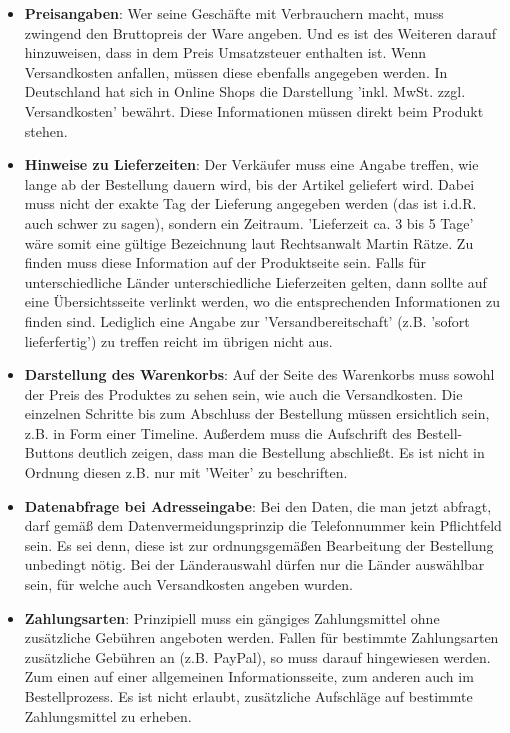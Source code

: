 \documentclass[a4paper]{article}
\begin{document}
\begin{itemize}

\item \textbf{Preisangaben}: Wer seine Geschäfte mit Verbrauchern macht, muss zwingend den Bruttopreis der Ware angeben. Und es ist des Weiteren darauf hinzuweisen, dass in dem Preis Umsatzsteuer enthalten ist. Wenn Versandkosten anfallen, müssen diese ebenfalls angegeben werden. In Deutschland hat sich in Online Shops die Darstellung 'inkl. MwSt. zzgl. Versandkosten' bewährt. Diese Informationen müssen direkt beim Produkt stehen.

\item \textbf{Hinweise zu Lieferzeiten}: Der Verkäufer muss eine Angabe treffen, wie lange ab der Bestellung dauern wird, bis der Artikel geliefert wird. Dabei muss nicht der exakte Tag der Lieferung angegeben werden (das ist i.d.R. auch schwer zu sagen), sondern ein Zeitraum. 'Lieferzeit ca. 3 bis 5 Tage' wäre somit eine gültige Bezeichnung laut Rechtsanwalt Martin Rätze. Zu finden muss diese Information auf der Produktseite sein. Falls für unterschiedliche Länder unterschiedliche Lieferzeiten gelten, dann sollte auf eine Übersichtsseite verlinkt werden, wo die entsprechenden Informationen zu finden sind. Lediglich eine Angabe zur 'Versandbereitschaft' (z.B. 'sofort lieferfertig') zu treffen reicht im übrigen nicht aus.

\item \textbf{Darstellung des Warenkorbs}: Auf der Seite des Warenkorbs muss sowohl der Preis des Produktes zu sehen sein, wie auch die Versandkosten. Die einzelnen Schritte bis zum Abschluss der Bestellung müssen ersichtlich sein, z.B. in Form einer Timeline. Außerdem muss die Aufschrift des Bestell-Buttons deutlich zeigen, dass man die Bestellung abschließt. Es ist nicht in Ordnung diesen z.B. nur mit 'Weiter' zu beschriften.

\item \textbf{Datenabfrage bei Adresseingabe}: Bei den Daten, die man jetzt abfragt, darf gemäß dem Datenvermeidungsprinzip die Telefonnummer kein Pflichtfeld sein. Es sei denn, diese ist zur ordnungsgemäßen Bearbeitung der Bestellung unbedingt nötig. Bei der Länderauswahl dürfen nur die Länder auswählbar sein, für welche auch Versandkosten angeben wurden.

\item \textbf{Zahlungsarten}: Prinzipiell muss ein gängiges Zahlungsmittel ohne zusätzliche Gebühren angeboten werden. Fallen für bestimmte Zahlungsarten zusätzliche Gebühren an (z.B. PayPal), so muss darauf hingewiesen werden. Zum einen auf einer allgemeinen Informationsseite, zum anderen auch im Bestellprozess. Es ist nicht erlaubt, zusätzliche Aufschläge auf bestimmte Zahlungsmittel zu erheben.


\end{itemize}
\end{document}
